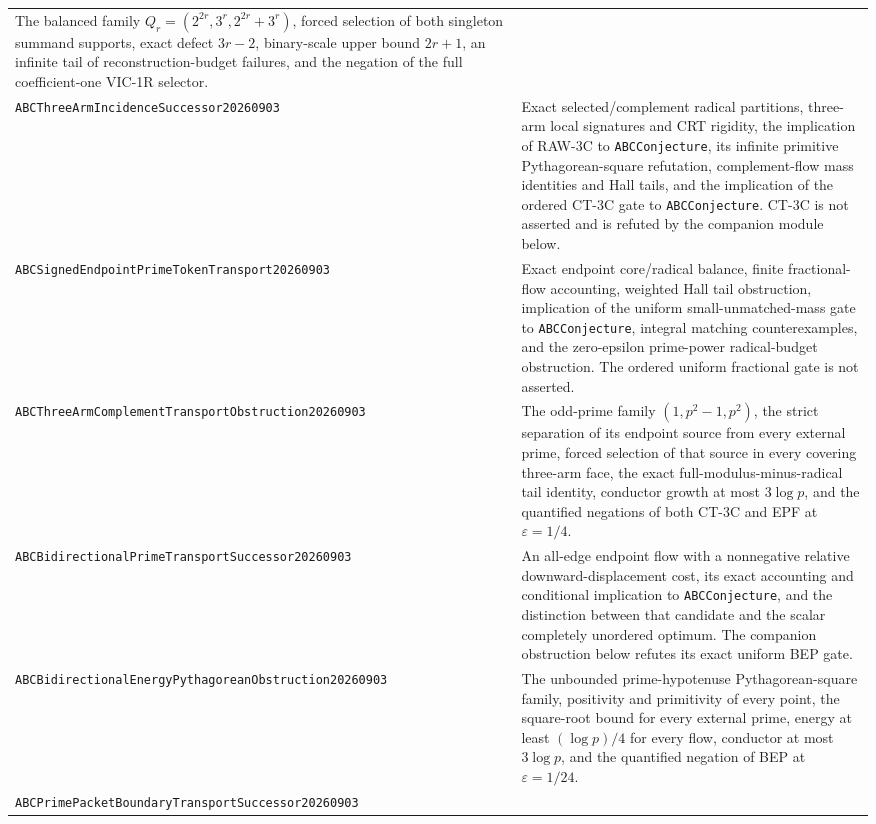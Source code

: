 \documentclass[11pt]{amsart}
\theoremstyle{definition}
\theoremstyle{remark}
\newcommand{\eps}{\varepsilon}
\begin{document}
\begin{longtable}{>{\raggedright\arraybackslash}p{}>{\raggedright\arraybackslash}p{}}
The balanced family $Q_r=(2^{2r},3^r,2^{2r}+3^r)$, forced selection of both
singleton summand supports, exact defect $3r-2$, binary-scale upper bound
$2r+1$, an infinite tail of reconstruction-budget failures, and the negation
of the full coefficient-one VIC-1R selector.\\[3pt]
\texttt{ABCThreeArm\allowbreak Incidence\allowbreak Successor20260903} &
Exact selected/complement radical partitions, three-arm local signatures and
CRT rigidity, the implication of RAW-3C to \texttt{ABCConjecture}, its
infinite primitive Pythagorean-square refutation, complement-flow mass
identities and Hall tails, and the implication of the ordered CT-3C gate to
\texttt{ABCConjecture}.  CT-3C is not asserted and is refuted by the companion
module below.\\[3pt]
\texttt{ABCSignedEndpointPrimeToken\allowbreak Transport20260903} & Exact
endpoint core/radical balance, finite fractional-flow accounting, weighted
Hall tail obstruction, implication of the uniform small-unmatched-mass gate
to \texttt{ABCConjecture}, integral matching counterexamples, and the
zero-epsilon prime-power radical-budget obstruction.  The ordered uniform
fractional gate is not asserted.\\[3pt]
\texttt{ABCThreeArmComplementTransport\allowbreak Obstruction20260903} &
The odd-prime family $(1,p^2-1,p^2)$, the strict separation of its endpoint
source from every external prime, forced selection of that source in every
covering three-arm face, the exact full-modulus-minus-radical tail identity,
conductor growth at most $3\log p$, and the quantified negations of both
CT-3C and EPF at $\eps=1/4$.\\[3pt]
\texttt{ABCBidirectionalPrimeTransport\allowbreak Successor20260903} &
An all-edge endpoint flow with a nonnegative relative downward-displacement
cost, its exact accounting and conditional implication to
\texttt{ABCConjecture}, and the distinction between that candidate and the
scalar completely unordered optimum.  The companion obstruction below
refutes its exact uniform BEP gate.\\[3pt]
\texttt{ABCBidirectionalEnergyPythagorean\allowbreak Obstruction20260903} &
The unbounded prime-hypotenuse Pythagorean-square family, positivity and
primitivity of every point, the square-root bound for every external prime,
energy at least $(\log p)/4$ for every flow, conductor at most $3\log p$, and
the quantified negation of BEP at $\eps=1/24$.\\[3pt]
\texttt{ABCPrimePacketBoundaryTransport\allowbreak Successor20260903} &

\end{longtable}
\end{document}
